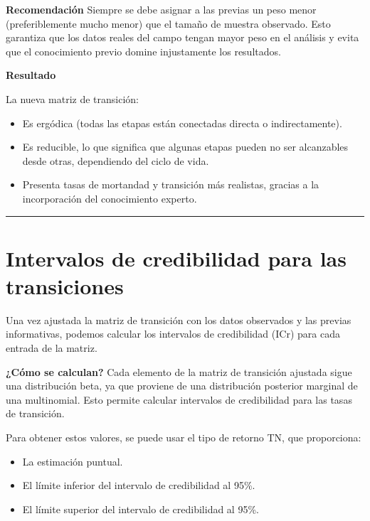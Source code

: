 \documentclass[
  12pt,
  letterpaper,
]{book}
\providecommand{\tightlist}{%
  \setlength{\itemsep}{0pt}\setlength{\parskip}{0pt}}\usepackage{longtable,booktabs,array}
\begin{document}
\textbf{Recomendación} Siempre se debe asignar a las previas un peso
menor (preferiblemente mucho menor) que el tamaño de muestra observado.
Esto garantiza que los datos reales del campo tengan mayor peso en el
análisis y evita que el conocimiento previo domine injustamente los
resultados.

\textbf{Resultado}

La nueva matriz de transición:

\begin{itemize}
\tightlist
\item
  Es ergódica (todas las etapas están conectadas directa o
  indirectamente).
\item
  Es reducible, lo que significa que algunas etapas pueden no ser
  alcanzables desde otras, dependiendo del ciclo de vida.
\item
  Presenta tasas de mortandad y transición más realistas, gracias a la
  incorporación del conocimiento experto.
\end{itemize}

\begin{center}\rule{0.5\linewidth}{0.5pt}\end{center}

\section{Intervalos de credibilidad para las
transiciones}\label{intervalos-de-credibilidad-para-las-transiciones}

Una vez ajustada la matriz de transición con los datos observados y las
previas informativas, podemos calcular los intervalos de credibilidad
(ICr) para cada entrada de la matriz.

\textbf{¿Cómo se calculan?} Cada elemento de la matriz de transición
ajustada sigue una distribución beta, ya que proviene de una
distribución posterior marginal de una multinomial. Esto permite
calcular intervalos de credibilidad para las tasas de transición.

Para obtener estos valores, se puede usar el tipo de retorno TN, que
proporciona:

\begin{itemize}
\tightlist
\item
  La estimación puntual.
\item
  El límite inferior del intervalo de credibilidad al 95\%.
\item
  El límite superior del intervalo de credibilidad al 95\%.
\end{itemize}
\end{document}
